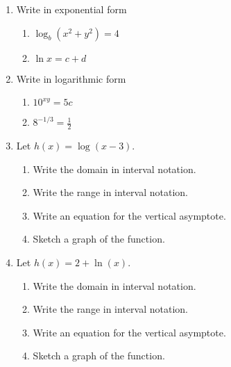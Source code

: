 \documentclass[12pt]{article}
\begin{document}
\begin{enumerate}
	
	
	\newpage
	\item Write in exponential form
		\begin{multicols}{2}
			\begin{enumerate}
				\item $\log_b(x^2+y^2)=4$
				\item $\ln x=c+d$
			\end{enumerate}
		\end{multicols}
		\vfill
	\item Write in logarithmic form
		\begin{multicols}{2}
			\begin{enumerate}
				\item $10^{xy}=5c$
				\item $8^{-1/3}=\frac{1}{2}$
			\end{enumerate}
		\end{multicols}
		\vfill
	\item Let $h(x)=\log(x-3)$.
		\begin{enumerate}
			\item Write the domain in interval notation.
			\vfill
			\item Write the range in interval notation.
			\vfill
			\item Write an equation for the vertical asymptote.
			\vfill
			\item Sketch a graph of the function.
			\vfill
			\vfill
		\end{enumerate}
	\newpage
	\item Let $h(x)=2+\ln(x)$.
		\begin{enumerate}
			\item Write the domain in interval notation.
			\vfill
			\item Write the range in interval notation.
			\vfill
			\item Write an equation for the vertical asymptote.
			\vfill
			\item Sketch a graph of the function.
			\vfill
			\vfill
		\end{enumerate}
	\newpage
	
	
	

\end{enumerate}
\end{document}
